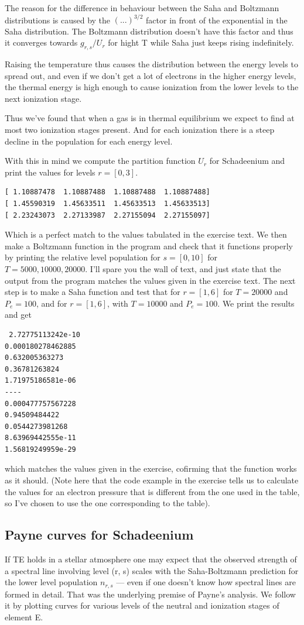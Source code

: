\documentclass{aa}   %
\begin{document}
The reason for the difference in behaviour between the Saha and Boltzmann distributions is caused by the $(...)^{3/2}$ factor in front of the exponential in the Saha distribution. The Boltzmann distribution doesn't have this factor and thus it converges towards $g_{r,s}/U_r$ for hight T while Saha just keeps rising indefinitely.

Raising the temperature thus causes the distribution between the energy levels to spread out, and even if we don't get a lot of electrons in the higher energy levels, the thermal energy is high enough to cause ionization from the lower levels to the next ionization stage.

Thus we've found that when a gas is in thermal equilibrium we expect to find at most two ionization stages present. And for each ionization there is a steep decline in the population for each energy level.

With this in mind we compute the partition function $U_r$ for Schadeenium and print the values for levels $r =[0,3]$.
\begin{verbatim}
[ 1.10887478  1.10887488  1.10887488  1.10887488]
[ 1.45590319  1.45633511  1.45633513  1.45633513]
[ 2.23243073  2.27133987  2.27155094  2.27155097]
\end{verbatim}
Which is a perfect match to the values tabulated in the exercise text.
We then make a Boltzmann function in the program and check that it functions properly by printing the relative level population for $s = [0,10]$ for $T = 5000,10000,20000$. I'll spare you the wall of text, and just state that the output from the program matches the values given in the exercise text.
The next step is to make a Saha function and test that for $r = [1,6]$ for $T = 20000$ and $P_e = 100$, and for $r = [1,6]$, with $T = 10000$ and $P_e = 100$. We print the results and get 
\begin{verbatim}
 2.72775113242e-10
0.000180278462885
0.632005363273
0.36781263824
1.71975186581e-06
----
0.000477757567228
0.94509484422
0.0544273981268
8.63969442555e-11
1.56819249959e-29
\end{verbatim}
which matches the values given in the exercise, cofirming that the function works as it should.
(Note here that the code example in the exercise tells us to calculate the values for an electron pressure that is different from the one used in the table, so I've chosen to use the one corresponding to the table).

\subsection{Payne curves for Schadeenium}
If TE holds in a stellar atmosphere one may expect that the observed strength of a spectral line involving level (r, s) scales with the Saha-Boltzmann prediction for the lower level population $n_{r,s}$ — even if one doesn’t know how spectral lines are formed in detail. That was the underlying premise of Payne’s analysis. We follow it by plotting curves for various levels of the neutral and ionization stages of element E.
\end{document}
